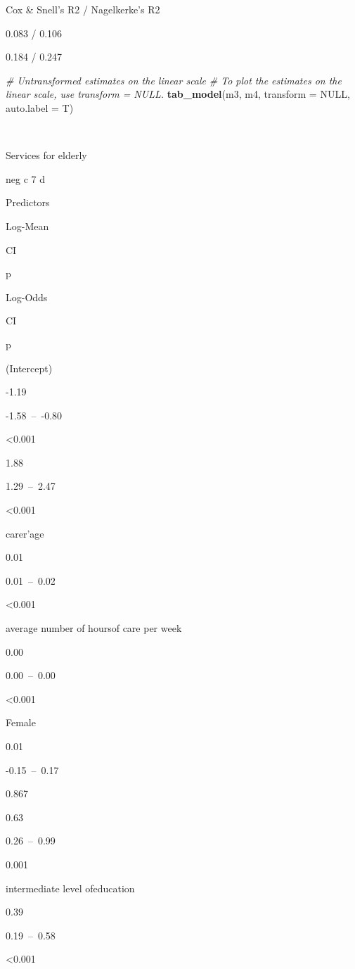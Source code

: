 \documentclass[]{article}
\newenvironment{Shaded}{\begin{snugshade}}{\end{snugshade}}
\newcommand{\KeywordTok}[1]{\textcolor[rgb]{0.13,0.29,0.53}{\textbf{#1}}}
\newcommand{\DataTypeTok}[1]{\textcolor[rgb]{0.13,0.29,0.53}{#1}}
\newcommand{\CommentTok}[1]{\textcolor[rgb]{0.56,0.35,0.01}{\textit{#1}}}
\newcommand{\OtherTok}[1]{\textcolor[rgb]{0.56,0.35,0.01}{#1}}
\newcommand{\NormalTok}[1]{#1}
\begin{document}
Cox \& Snell's R2 / Nagelkerke's R2

0.083 / 0.106

0.184 / 0.247

\begin{Shaded}
\begin{Highlighting}[]
\CommentTok{# Untransformed estimates on the linear scale}
\CommentTok{# To plot the estimates on the linear scale, use transform = NULL.}
\KeywordTok{tab_model}\NormalTok{(m3, m4, }\DataTypeTok{transform =} \OtherTok{NULL}\NormalTok{, }\DataTypeTok{auto.label =}\NormalTok{ T)}
\end{Highlighting}
\end{Shaded}

~

Services for elderly

neg c 7 d

Predictors

Log-Mean

CI

p

Log-Odds

CI

p

(Intercept)

-1.19

-1.58~--~-0.80

\textless{}0.001

1.88

1.29~--~2.47

\textless{}0.001

carer'age

0.01

0.01~--~0.02

\textless{}0.001

average number of hoursof care per week

0.00

0.00~--~0.00

\textless{}0.001

Female

0.01

-0.15~--~0.17

0.867

0.63

0.26~--~0.99

0.001

intermediate level ofeducation

0.39

0.19~--~0.58

\textless{}0.001
\end{document}
